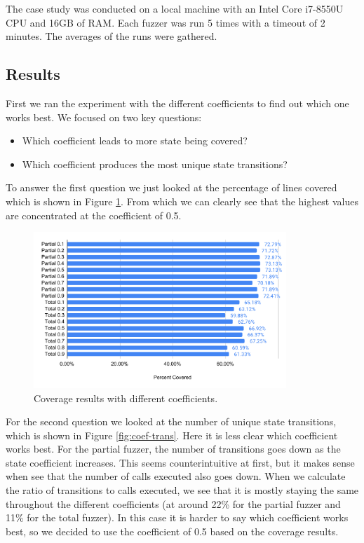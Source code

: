 The case study was conducted on a local machine with an Intel Core i7-8550U CPU and 16GB of RAM.
Each fuzzer was run 5 times with a timeout of 2 minutes.
The averages of the runs were gathered.

\subsection*{Results}
First we ran the experiment with the different coefficients to find out which one works best. We focused on two key questions:
\begin{itemize}
    \item Which coefficient leads to more state being covered?
    \item Which coefficient produces the most unique state transitions?
\end{itemize}

To answer the first question we just looked at the percentage of lines covered which is shown in Figure \ref{fig:case-study-coeff}.
From which we can clearly see that the highest values are concentrated at the coefficient of 0.5.

\begin{figure}[htbp]
    \centering
    \includegraphics[width=0.85\textwidth]{charts/coef-cov.pdf}
    \caption{Coverage results with different coefficients.}\label{fig:case-study-coeff}
\end{figure}


For the second question we looked at the number of unique state transitions, which is shown in Figure \ref{fig:coef-trans}.
Here it is less clear which coefficient works best.
For the partial fuzzer, the number of transitions goes down as the state coefficient increases.
This seems counterintuitive at first, but it makes sense when see that the number of calls executed also goes down.
When we calculate the ratio of transitions to calls executed, we see that it is mostly staying the same throughout the different coefficients (at around 22\% for the partial fuzzer and 11\% for the total fuzzer).
In this case it is harder to say which coefficient works best, so we decided to use the coefficient of 0.5 based on the coverage results.

